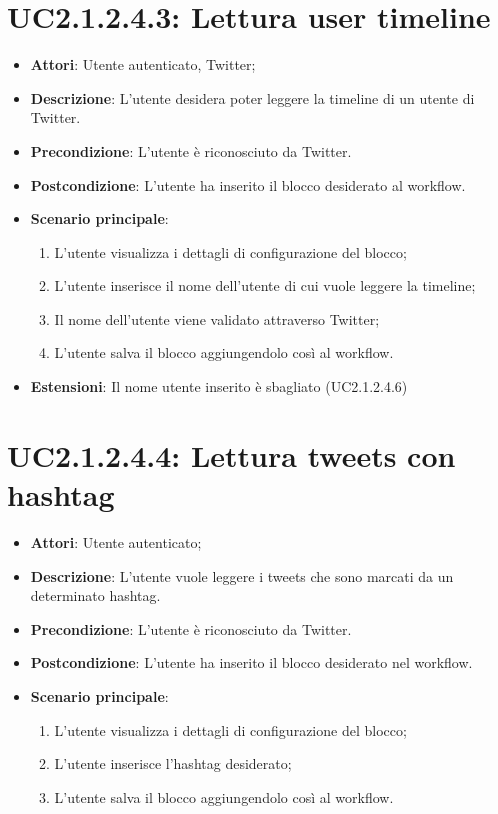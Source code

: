 \section{UC2.1.2.4.3: Lettura user timeline}
\label{UC2.1.2.4.3}
\begin{itemize}
	\item \textbf{Attori}: Utente autenticato, Twitter;
	\item \textbf{Descrizione}: L'utente desidera poter leggere la timeline di un utente di Twitter.
	\item \textbf{Precondizione}: L'utente è riconosciuto da Twitter.
	\item \textbf{Postcondizione}: L'utente ha inserito il blocco desiderato al workflow.
	\item \textbf{Scenario principale}:
	\begin{enumerate}\item L'utente visualizza i dettagli di configurazione del blocco;  \item L'utente inserisce il nome dell'utente di cui vuole leggere la timeline;  \item  Il nome dell'utente viene validato attraverso Twitter;  \item L'utente salva il blocco aggiungendolo così al workflow.\end{enumerate}
	\item \textbf{Estensioni}:
	Il nome utente inserito è sbagliato (UC2.1.2.4.6)
\end{itemize}

\section{UC2.1.2.4.4: Lettura tweets con hashtag}
\label{UC2.1.2.4.4}
\begin{itemize}
	\item \textbf{Attori}: Utente autenticato;
	\item \textbf{Descrizione}: L'utente vuole leggere i tweets che sono marcati da un determinato hashtag.
	\item \textbf{Precondizione}: L'utente è riconosciuto da Twitter.
	\item \textbf{Postcondizione}: L'utente ha inserito il blocco desiderato nel workflow.
	\item \textbf{Scenario principale}:
	\begin{enumerate} \item L'utente visualizza i dettagli di configurazione del blocco; \item L'utente inserisce l'hashtag desiderato;  \item  L'utente salva il blocco aggiungendolo così al workflow. \end{enumerate}
\end{itemize}

